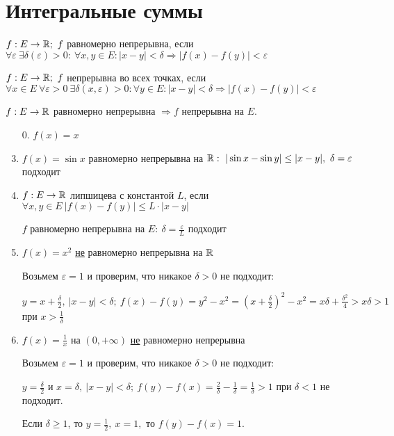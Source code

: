\section{Интегральные суммы}
\begin{definition}
    $f:E\rightarrow \mathbb{R};\ f$ равномерно непрерывна, если $\forall \varepsilon\ \exists \delta(\varepsilon) >0:\ \forall x,y\in E:|x-y|<\delta\Rightarrow |f(x)-f(y)|<\varepsilon$ 
\end{definition}

\begin{remark}
    $f:E\rightarrow \mathbb{R};\ f$  непрерывна во всех точках, если $\forall x\in E\ \forall \varepsilon>0\ \exists \delta(x,\varepsilon) >0:\forall y\in E:|x-y|<\delta\Rightarrow |f(x)-f(y)|<\varepsilon$ 
\end{remark}

\begin{statement}
    $f:E\rightarrow \mathbb{R}$ равномерно непрерывна $\Rightarrow f$ непрерывна на $E$.
\end{statement}

\begin{example}
    \begin{enumerate}
        \item[]
        \item[0.] $f(x)=x$
        \item $f(x) = \sin x$ равномерно непрерывна на $\mathbb{R}:\ |\sin x-\sin y|\leq |x-y|,\ \delta=\varepsilon$ подходит
        \item $f:E\rightarrow \mathbb{R}$ липшицева с константой $L$, если $\forall x,y\in E\ |f(x)-f(y)|\leq L\cdot|x-y|$ 
        
        $f$ равномерно непрерывна на $E:\ \delta=\frac{\varepsilon}{L}$ подходит
        \item $f(x)=x^2$ \underline{не} равномерно непрерывна на $\mathbb{R}$

        Возьмем $\varepsilon=1$ и проверим, что никакое $\delta>0$ не подходит:

        $y=x+\frac{\delta}{2},\ |x-y|<\delta;\ f(x)-f(y)=y^2-x^2=(x+\frac{\delta}{2})^2-x^2=x\delta+\frac{\delta^2}{4}>x\delta >1$ при $x>\frac{1}{\delta}$
        \item $f(x)=\frac{1}{x}$ на $(0,+\infty)$ \underline{не} равномерно непрерывна

        Возьмем $\varepsilon=1$ и проверим, что никакое $\delta>0$ не подходит:

        $y=\frac{\delta}{2}$ и $x=\delta,\ |x-y|<\delta;\ f(y)-f(x)=\frac{2}{\delta}-\frac{1}{\delta}=\frac{1}{\delta}>1$ при $\delta<1$ не подходит.

        Если $\delta\geq 1$, то $y=\frac{1}{2},\ x=1,$ то $f(y)-f(x)=1$.
    \end{enumerate}
\end{example}


